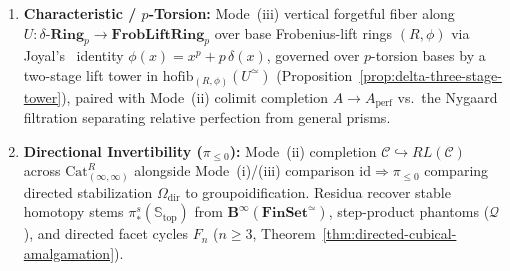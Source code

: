 \begin{enumerate}
  \item \textbf{Characteristic / $p$-Torsion:} Mode~(iii) vertical forgetful fiber along $U : \delta\text{-}\mathbf{Ring}_p \to \mathbf{FrobLiftRing}_p$ over base Frobenius-lift rings $(R, \phi)$ via Joyal's~\cite{Joyal85} identity $\phi(x) = x^p + p\,\delta(x)$, governed over $p$-torsion bases by a two-stage lift tower in $\mathrm{hofib}_{(R,\phi)}(U^{\simeq})$ (Proposition~\ref{prop:delta-three-stage-tower}), paired with Mode~(ii) colimit completion $A \to A_{\mathrm{perf}}$ vs.\ the Nygaard filtration separating relative perfection from general prisms.
  \item \textbf{Directional Invertibility ($\pi_{\le 0}$):} Mode~(ii) completion $\mathcal{C} \hookrightarrow RL(\mathcal{C})$ across $\mathrm{Cat}^R_{(\infty,\infty)}$ alongside Mode~(i)/(iii) comparison $\mathrm{id} \Rightarrow \pi_{\le 0}$ comparing directed stabilization $\Omega_{\mathrm{dir}}$ to groupoidification. Residua recover stable homotopy stems $\pi_*^s(\mathbb{S}_{\mathrm{top}})$ from $\mathbf{B}^\infty(\mathbf{FinSet}^{\simeq})$, step-product phantoms ($\mathcal{Q}$), and directed facet cycles $F_n$ ($n \ge 3$, Theorem~\ref{thm:directed-cubical-amalgamation}).
\end{enumerate}


